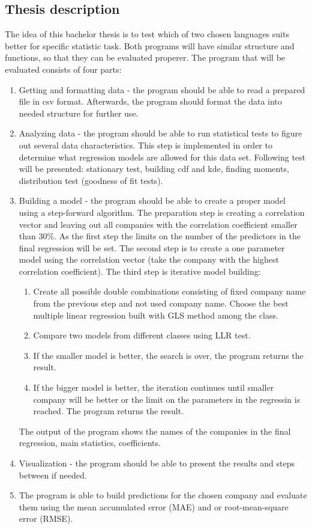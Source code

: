 \documentclass{article}
\begin{document}
\subsection{Thesis description}
The idea of this bachelor thesis is to test which of two chosen languages suits better for specific statistic task. Both programs will have similar structure and functions, so that they can be evaluated properer. The program that will be evaluated consists of four parts:
\begin{enumerate}
    \item Getting and formatting data - the program should be able to read a prepared file in csv format. Afterwards, the program should format the data into needed structure for further use.
    \item Analyzing data - the program should be able to run statistical tests to figure out several data characteristics. This step is implemented in order to determine what regression models are allowed for this data set. Following test will be presented: stationary test, building cdf and kde, finding moments, distribution test (goodness of fit tests).
    \item Building a model - the program should be able to create a proper model using a step-forward algorithm. The preparation step is creating a correlation vector and leaving out all companies with the correlation coefficient smaller than 30\%. As the first step the limits on the number of the predictors in the final regression will be set. The second step is to create a one parameter model using the correlation vector (take the company with the highest correlation coefficient). The third step is iterative model building: 
    \begin{enumerate}
        \item Create all possible double combinations consisting of fixed company name from the previous step and not used company name. Choose the best multiple linear regression built with GLS method among the class. 
        \item Compare two models from different classes using LLR test.
        \item If the smaller model is better, the search is over, the program returns the result.
        \item If the bigger model is better, the iteration continues until smaller company will be better or the limit on the parameters in the regressin is reached. The program returns the result. 
    \end{enumerate}
The output of the program shows the names of the companies in the final regression, main statistics, coefficients.
    \item Visualization - the program should be able to present the results and steps between if needed.
    \item The program is able to build predictions for the chosen company and evaluate them using the mean accumulated error (MAE) and or root-mean-square error (RMSE).
\end{enumerate}
\end{document}
